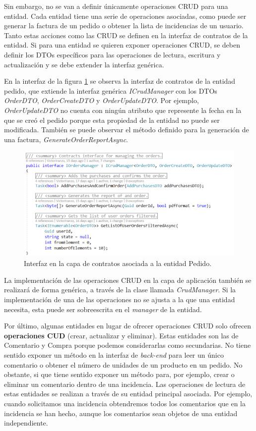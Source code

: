 \documentclass[11pt,spanish,listoffigures]{tfgetsinf}
\begin{document}
Sin embargo, no se van a definir únicamente operaciones CRUD para una entidad. Cada entidad tiene una serie de operaciones asociadas, como puede ser generar la factura de un pedido o obtener la lista de incidencias de un usuario. Tanto estas acciones como las CRUD se definen en la interfaz de contratos de la entidad. Si para una entidad se quieren exponer operaciones CRUD, se deben definir los DTOs específicos para las operaciones de lectura, escritura y actualización y se debe extender la interfaz genérica. 

En la interfaz de la figura \ref{fig:IOrdersManager} se observa la interfaz de contratos de la entidad pedido, que extiende la interfaz genérica \textit{ICrudManager} con los DTOs \textit{OrderDTO}, \textit{OrderCreateDTO} y \textit{OrderUpdateDTO}. Por ejemplo, \textit{OrderUpdateDTO} no cuenta con ningún atributo que represente la fecha en la que se creó el pedido porque esta propiedad de la entidad no puede ser modificada. También se puede observar el método definido para la generación de una factura, \textit{GenerateOrderReportAsync}.

\begin{figure}[h]
\centering
\includegraphics[scale=0.8]{IOrdersManager}
\caption{Interfaz en la capa de contratos asociada a la entidad Pedido.}
\label{fig:IOrdersManager}
\end{figure}

La implementación de las operaciones CRUD en la capa de aplicación también se realizará de forma genérica, a través de la clase llamada \textit{CrudManager}. Si la implementación de una de las operaciones no se ajusta a la que una entidad necesita, esta puede ser sobreescrita en el \textit{manager} de la entidad.

Por último, algunas entidades en lugar de ofrecer operaciones CRUD solo ofrecen \textbf{operaciones CUD} (crear, actualizar y eliminar). Estas entidades son las de Comentario y Compra porque podemos considerarlas como secundarias. No tiene sentido exponer un método en la interfaz de \textit{back-end} para leer un único comentario o obtener el número de unidades de un producto en un pedido. No obstante, si que tiene sentido exponer un método para, por ejemplo, crear o eliminar un comentario dentro de una incidencia. Las operaciones de lectura de estas entidades se realizan a través de su entidad principal asociada. Por ejemplo, cuando solicitamos una incidencia obtendremos todos los comentarios que en la incidencia se han hecho, aunque los comentarios sean objetos de una entidad independiente.
\end{document}
